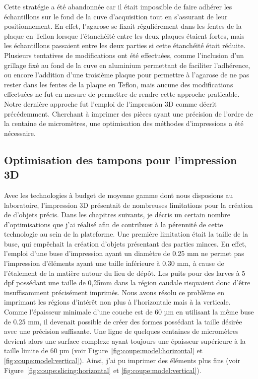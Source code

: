 \documentclass[\main/main.tex]{subfiles}
\begin{document}
%
Cette stratégie a été abandonnée car il était impossible de faire adhérer les échantillons sur le fond de la cuve d'acquisition tout en s'assurant de leur positionnement.
%
En effet, l'agarose se fixait réguliérement dans les fentes de la plaque en Teflon lorsque l'étanchéité entre les deux plaques étaient fortes, mais les échantillons passaient entre les deux parties si cette étanchéité était réduite.
%
Plusieurs tentatives de modifications ont été effectuées, comme l'inclusion d'un grillage fixé au fond de la cuve en aluminium permettant de faciliter l'adhérence, ou encore l'addition d'une troisième plaque pour permettre à l'agarose de ne pas rester dans les fentes de la plaque en Teflon, mais aucune des modifications effectuées ne fut en mesure de permettre de rendre cette approche praticable.
%
Notre dernière approche fut l'emploi de l'impression 3D comme décrit précédemment.
%
Cherchant à imprimer des pièces ayant une précision de l'ordre de la centaine de micromètres, une optimisation des méthodes d'impressions a été nécessaire. 

    \subsection{Optimisation des tampons pour l'impression 3D}

%
Avec les technologies à budget de moyenne gamme dont nous disposions au laboratoire, l'impression 3D présentait de nombreuses limitations pour la création de d'objets précis. Dans les chapitres suivants, je décris un certain nombre d'optimisations que j'ai réalisé afin de contribuer à la pérennité de cette technologie au sein de la plateforme.
%
Une première limitation était la taille de la buse, qui empêchait la création d'objets présentant des parties minces.
%
En effet, l'emploi d'une buse d'impression ayant un diamètre de 0.25 mm ne permet pas l'impression d'éléments ayant une taille inférieure à 0.30 mm, à cause de l'étalement de la matière autour du lieu de dépôt. Les puits pour des larves à 5 dpf possédant une taille de 0,25mm dans la région caudale risquaient donc d'être insuffisamment précisément imprimés.
%
Nous avons résolu ce problème en imprimant les régions d'intérêt non plus à l'horizontale mais à la verticale. Comme l'épaisseur minimale d'une couche est de 60 µm en utilisant la même buse de 0.25 mm, il devenait possible de créer des formes possédant la taille désirée avec une précision suffisante.
%
Une ligne de quelques centaines de micromètres devient alors une surface complexe ayant toujours une épaisseur supérieure à la taille limite de 60 µm  (voir Figure~\ref{fig:coupe:model:horizontal} et \ref{fig:coupe:model:vertical}).
%
Ainsi, j'ai pu imprimer des éléments plus fins (voir Figure~\ref{fig:coupe:slicing:horizontal} et \ref{fig:coupe:model:vertical}).
\end{document}
